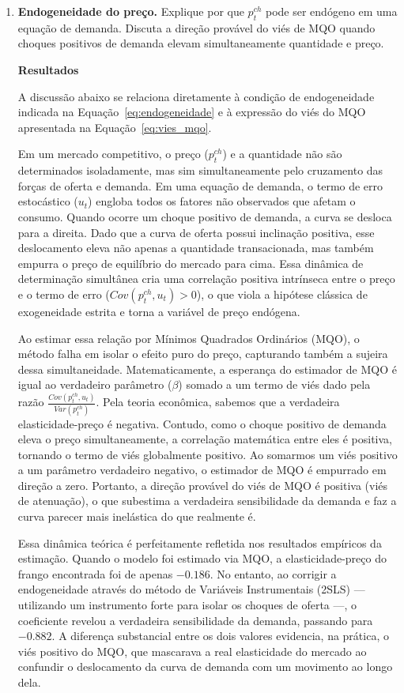 \documentclass[12pt,a4paper]{article}
\begin{document}
\begin{enumerate}[label=\textbf{\arabic*.}]
\item \textbf{Endogeneidade do preço.} Explique por que $p_t^{ch}$ pode ser endógeno
    em uma equação de demanda. Discuta a direção provável do viés de MQO quando choques positivos de demanda elevam simultaneamente quantidade e preço.

\textbf{Resultados}

A discussão abaixo se relaciona diretamente à condição de endogeneidade indicada na Equação~\eqref{eq:endogeneidade} e à expressão do viés do MQO apresentada na Equação~\eqref{eq:vies_mqo}.

    Em um mercado competitivo, o preço ($p_t^{ch}$) e a quantidade não são determinados isoladamente, mas sim simultaneamente pelo cruzamento das forças de oferta e demanda. Em uma equação de demanda, o termo de erro estocástico ($u_t$) engloba todos os fatores não observados que afetam o consumo. Quando ocorre um choque positivo de demanda, a curva se desloca para a direita. Dado que a curva de oferta possui inclinação positiva, esse deslocamento eleva não apenas a quantidade transacionada, mas também empurra o preço de equilíbrio do mercado para cima. Essa dinâmica de determinação simultânea cria uma correlação positiva intrínseca entre o preço e o termo de erro ($Cov(p_t^{ch}, u_t) > 0$), o que viola a hipótese clássica de exogeneidade estrita e torna a variável de preço endógena.

    Ao estimar essa relação por Mínimos Quadrados Ordinários (MQO), o método falha em isolar o efeito puro do preço, capturando também a sujeira dessa simultaneidade. Matematicamente, a esperança do estimador de MQO é igual ao verdadeiro parâmetro ($\beta$) somado a um termo de viés dado pela razão $\frac{Cov(p_t^{ch}, u_t)}{Var(p_t^{ch})}$. Pela teoria econômica, sabemos que a verdadeira elasticidade-preço é negativa. Contudo, como o choque positivo de demanda eleva o preço simultaneamente, a correlação matemática entre eles é positiva, tornando o termo de viés globalmente positivo. Ao somarmos um viés positivo a um parâmetro verdadeiro negativo, o estimador de MQO é empurrado em direção a zero. Portanto, a direção provável do viés de MQO é positiva (viés de atenuação), o que subestima a verdadeira sensibilidade da demanda e faz a curva parecer mais inelástica do que realmente é.

    Essa dinâmica teórica é perfeitamente refletida nos resultados empíricos da estimação. Quando o modelo foi estimado via MQO, a elasticidade-preço do frango encontrada foi de apenas $-0.186$. No entanto, ao corrigir a endogeneidade através do método de Variáveis Instrumentais (2SLS) — utilizando um instrumento forte para isolar os choques de oferta —, o coeficiente revelou a verdadeira sensibilidade da demanda, passando para $-0.882$. A diferença substancial entre os dois valores evidencia, na prática, o viés positivo do MQO, que mascarava a real elasticidade do mercado ao confundir o deslocamento da curva de demanda com um movimento ao longo dela.


\end{enumerate}
\end{document}
